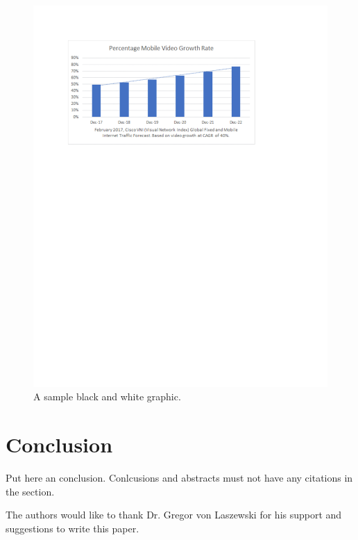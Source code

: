 \documentclass[sigconf]{acmart}
\begin{document}
\begin{figure}
\includegraphics{images/graph}
\caption{A sample black and white graphic. \cite{??}}
\label{F:graph}
\end{figure}



\section{Conclusion}

Put here an conclusion. Conlcusions and abstracts must not have any
citations in the section.


\begin{acks}

  The authors would like to thank Dr. Gregor von Laszewski for his
  support and suggestions to write this paper.

\end{acks}


 
\end{document}
